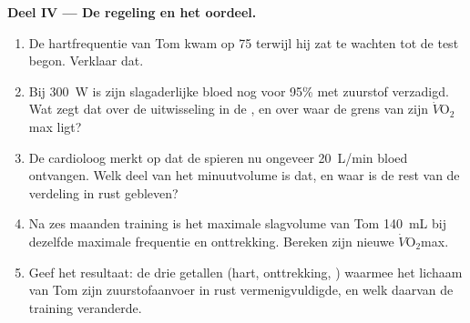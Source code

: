 \begin{problem}
\medskip
\noindent\textbf{Deel IV --- De regeling en het oordeel.}
\begin{enumerate}[resume]
  \item De hartfrequentie van Tom kwam op 75 terwijl hij zat te wachten
        tot de test begon. Verklaar dat.
  \item Bij \qty{300}{W} is zijn slagaderlijke bloed nog voor 95\% met
        zuurstof verzadigd. Wat zegt dat over de uitwisseling in de
        , en over waar de grens van zijn
        $\dot V\!\mathrm{O_2}$max ligt?
  \item De cardioloog merkt op dat de spieren nu ongeveer
        \qty{20}{L/min} bloed ontvangen. Welk deel van het minuutvolume
        is dat, en waar is de rest van de verdeling in rust gebleven?
  \item Na zes maanden training is het maximale slagvolume van Tom
        \qty{140}{mL} bij dezelfde maximale frequentie en onttrekking.
        Bereken zijn nieuwe $\dot V\!\mathrm{O_2}$max.
  \item Geef het resultaat: de drie getallen (hart, onttrekking,
        ) waarmee het lichaam van Tom zijn zuurstofaanvoer in
        rust vermenigvuldigde, en welk daarvan de training veranderde.
\end{enumerate}
\end{problem}
